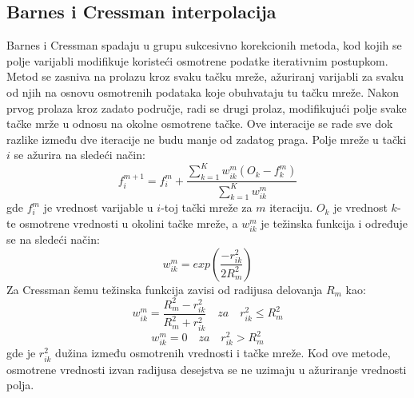 \documentclass[12pt]{article}
\begin{document}
\subsection{Barnes i Cressman interpolacija}
Barnes i Cressman spadaju u grupu sukcesivno korekcionih metoda, kod kojih se polje varijabli modifikuje koristeći osmotrene podatke iterativnim postupkom. Metod se zasniva na prolazu kroz svaku tačku mreže, ažuriranj varijabli za svaku od njih na osnovu osmotrenih podataka koje obuhvataju tu tačku mreže. Nakon prvog prolaza kroz zadato područje, radi se drugi prolaz, modifikujući polje svake tačke mrže u odnosu na okolne osmotrene tačke. Ove interacije se rade sve dok razlike između dve iteracije ne budu manje od zadatog praga.  
Polje mreže u tački $i$ se ažurira na sledeći način:
\begin{equation}
f_{i}^{m+1}=f_{i}^{m}+\frac{\sum_{k=1}^{K}w_{ik}^{m}(O_{k}-f_{k}^{m})}{\sum_{k=1}^{K}w_{ik}^{m}}
\end{equation}
gde $f_{i}^m$ je vrednost varijable u $i$-toj tački mreže za $m$ iteraciju. $O_k$ je vrednost $k$-te osmotrene vrednosti u okolini tačke mreže, a $w_{ik}^m$ je težinska funkcija i određuje se na sledeći način:
\begin{equation}
w_{ik}^m = exp(\frac{-r_{ik}^{2}}{2R_{m}^2})
\end{equation}
Za Cressman šemu težinska funkcija zavisi od radijusa delovanja $R_m$ kao:
\begin{equation}\label{key}
w_{ik}^m = \frac{R_{m}^{2}-r_{ik}^2}{R_{m}^{2}+r_{ik}^2}\quad za \quad r_{ik}^{2}\leq R_{m}^2
\end{equation}
\begin{equation}\label{key}
w_{ik}^{m}=0 \quad za \quad r_{ik}^{2}> R_{m}^2
\end{equation}
gde je $r_{ik}^2$ dužina između osmotrenih vrednosti i tačke mreže. Kod ove metode, osmotrene vrednosti izvan radijusa desejstva se ne uzimaju u ažuriranje vrednosti polja. 
\end{document}
